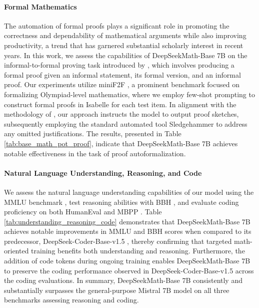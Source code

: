 \begin{itemize}[topsep=0pt]
\paragraph{Formal Mathematics}

The automation of formal proofs plays a significant role in promoting the correctness and dependability of mathematical arguments while also improving productivity, a trend that has garnered substantial scholarly interest in recent years. In this work, we assess the capabilities of DeepSeekMath-Base 7B on the informal-to-formal proving task introduced by \citep{dsp_proof}, which involves producing a formal proof given an informal statement, its formal version, and an informal proof. Our experiments utilize miniF2F \citep{minif2f}, a prominent benchmark focused on formalizing Olympiad-level mathematics, where we employ few-shot prompting to construct formal proofs in Isabelle for each test item. In alignment with the methodology of \cite{dsp_proof}, our approach instructs the model to output proof sketches, subsequently employing the standard automated tool Sledgehammer \citep{sledgehammer} to address any omitted justifications. The results, presented in Table \ref{tab:base_math_pot_proof}, indicate that DeepSeekMath-Base 7B achieves notable effectiveness in the task of proof autoformalization.

\paragraph{Natural Language Understanding, Reasoning, and Code}

We assess the natural language understanding capabilities of our model using the MMLU benchmark \citep{mmlu}, test reasoning abilities with BBH \citep{bbh}, and evaluate coding proficiency on both HumanEval \citep{codex} and MBPP \citep{mbpp}. Table \ref{tab:understanding_reasoning_code} demonstrates that DeepSeekMath-Base 7B achieves notable improvements in MMLU and BBH scores when compared to its predecessor, DeepSeek-Coder-Base-v1.5 \citep{deepseek-coder}, thereby confirming that targeted math-oriented training benefits both understanding and reasoning. Furthermore, the addition of code tokens during ongoing training enables DeepSeekMath-Base 7B to preserve the coding performance observed in DeepSeek-Coder-Base-v1.5 across the coding evaluations. In summary, DeepSeekMath-Base 7B consistently and substantially surpasses the general-purpose Mistral 7B model \citep{mistral} on all three benchmarks assessing reasoning and coding.


\end{itemize}
